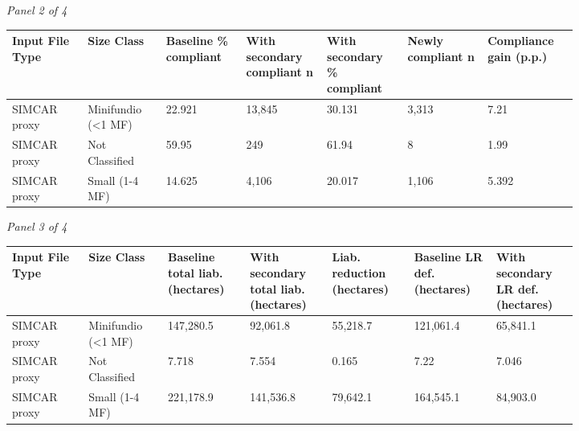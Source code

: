 \documentclass[12pt]{article}
\begin{document}
\begin{landscape}
\begin{table}[H]
\textit{Panel 2 of 4}\\[2pt]
{\fontsize{12}{14}\selectfont
\setlength{\tabcolsep}{3pt}
\renewcommand{\arraystretch}{1.08}
\begin{tabular}{p{0.117\linewidth}p{0.117\linewidth}p{0.117\linewidth}p{0.117\linewidth}p{0.117\linewidth}p{0.117\linewidth}p{0.117\linewidth}}
\toprule
Input File Type & Size Class & Baseline \% compliant & With secondary compliant n & With secondary \% compliant & Newly compliant n & Compliance gain (p.p.) \\
\midrule
SIMCAR proxy & Minifundio (<1 MF) & 22.921 & 13,845 & 30.131 & 3,313 & 7.21 \\
SIMCAR proxy & Not Classified & 59.95 & 249 & 61.94 & 8 & 1.99 \\
SIMCAR proxy & Small (1-4 MF) & 14.625 & 4,106 & 20.017 & 1,106 & 5.392 \\
\bottomrule
\end{tabular}
}

\vspace{0.6em}

\textit{Panel 3 of 4}\\[2pt]
{\fontsize{12}{14}\selectfont
\setlength{\tabcolsep}{3pt}
\renewcommand{\arraystretch}{1.08}
\begin{tabular}{p{0.117\linewidth}p{0.117\linewidth}p{0.117\linewidth}p{0.117\linewidth}p{0.117\linewidth}p{0.117\linewidth}p{0.117\linewidth}}
\toprule
Input File Type & Size Class & Baseline total liab. (hectares) & With secondary total liab. (hectares) & Liab. reduction (hectares) & Baseline LR def. (hectares) & With secondary LR def. (hectares) \\
\midrule
SIMCAR proxy & Minifundio (<1 MF) & 147,280.5 & 92,061.8 & 55,218.7 & 121,061.4 & 65,841.1 \\
SIMCAR proxy & Not Classified & 7.718 & 7.554 & 0.165 & 7.22 & 7.046 \\
SIMCAR proxy & Small (1-4 MF) & 221,178.9 & 141,536.8 & 79,642.1 & 164,545.1 & 84,903.0 \\
\bottomrule
\end{tabular}
}

\vspace{0.6em}


\end{table}
\end{landscape}
\end{document}
